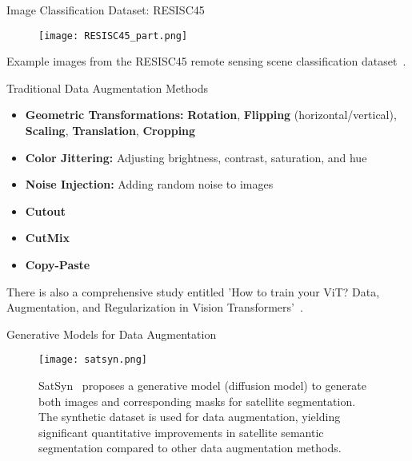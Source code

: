 \begin{refsection}
  \begin{frame}{Image Classification Dataset: RESISC45}
    \begin{figure}
      \centering
      \texttt{[image: RESISC45\_part.png]}
    \end{figure}
    \scriptsize
    Example images from the RESISC45 remote sensing scene classification dataset~\parencite{Cheng2017}.
    \bottomleftrefs
  \end{frame}
\end{refsection}

\begin{refsection}
  \begin{frame}{Traditional Data Augmentation Methods}
    \begin{itemize}
      \item \textbf{Geometric Transformations:} \textbf{Rotation}, \textbf{Flipping} (horizontal/vertical), \textbf{Scaling}, \textbf{Translation}, \textbf{Cropping}
      \item \textbf{Color Jittering:} Adjusting brightness, contrast, saturation, and hue
      \item \textbf{Noise Injection:} Adding random noise to images
      \item \textbf{Cutout}~\parencite{devriesImprovedRegularizationConvolutional2017}
      \item \textbf{CutMix}~\parencite{yunCutMixRegularizationStrategy2019}
      \item \textbf{Copy-Paste}~\parencite{ghiasiSimpleCopyPasteStrong2021}
    \end{itemize}
    There is also a comprehensive study entitled 'How to train your ViT? Data, Augmentation,  and Regularization in Vision Transformers'~\parencite{steinerHowTrainYour2022}.
    \bottomleftrefs
  \end{frame}
\end{refsection}

\begin{refsection}
  \begin{frame}{Generative Models for Data Augmentation}
    \begin{figure}
      \centering
      \texttt{[image: satsyn.png]}
      
      \vspace{0.5em}
      \caption{\scriptsize SatSyn~\parencite{tokerSatSynthAugmentingImageMask2024} proposes a generative model (diffusion model) to generate both images and corresponding masks for satellite segmentation. The synthetic dataset is used for data augmentation, yielding significant quantitative improvements in satellite semantic segmentation compared to other data augmentation methods.}
    \end{figure}

    \bottomleftrefs
  \end{frame}
\end{refsection}

